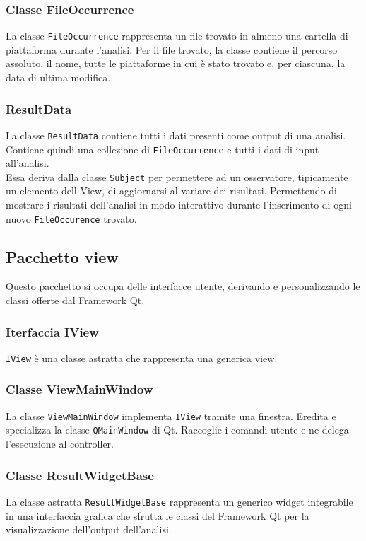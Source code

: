 \subsubsection{Classe FileOccurrence}
La classe \texttt{FileOccurrence} rappresenta un file trovato in almeno una cartella di piattaforma durante l'analisi. Per il file trovato, la classe contiene il percorso assoluto, il nome, tutte le piattaforme in cui è stato trovato e, per ciascuna, la data di ultima modifica. 

\subsubsection{ResultData}
La classe \texttt{ResultData} contiene tutti i dati presenti come output di una analisi. Contiene quindi una collezione di \texttt{FileOccurrence} e tutti i dati di input all'analisi.\\
Essa deriva dalla classe \texttt{Subject} per permettere ad un osservatore, tipicamente un elemento dell View, di aggiornarsi al variare dei risultati. Permettendo di mostrare i risultati dell'analisi in modo interattivo durante l'inserimento di ogni nuovo \texttt{FileOccurence} trovato.

\subsection{Pacchetto view}
Questo pacchetto si occupa delle interfacce utente, derivando e personalizzando le classi offerte dal Framework Qt.

\subsubsection{Iterfaccia IView}
\texttt{IView} è una classe astratta che rappresenta una generica view.

\subsubsection{Classe ViewMainWindow}
La classe \texttt{ViewMainWindow} implementa \texttt{IView} tramite una finestra. Eredita e specializza la classe \texttt{QMainWindow} di Qt. Raccoglie i comandi utente e ne delega l'esecuzione al controller.

\subsubsection{Classe ResultWidgetBase}
La classe astratta \texttt{ResultWidgetBase} rappresenta un generico widget integrabile in una interfaccia grafica che sfrutta le classi del Framework Qt per la visualizzazione dell'output dell'analisi.

